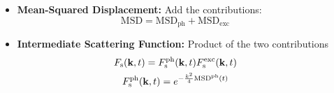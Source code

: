 \begin{frame}
\begin{columns}[T]
\begin{column}[T]{0.5\textwidth}
\end{column}


\begin{column}[t]{0.5\textwidth}
\vspace{-12pt}
\begin{itemize}
    \item<4-> \textbf{Mean-Squared Displacement:} Add the contributions:
    \begin{equation*}
    \mathrm{MSD}=\mathrm{MSD}_\mathrm{ph}+\mathrm{MSD}_\mathrm{exc}
    \end{equation*}
    \item<7-> \textbf{Intermediate Scattering Function:} Product of the two contributions
    \begin{gather*}
    F_\mathrm{s}(\mathbf{k},t) = F^\mathrm{ph}_\mathrm{s}(\mathbf{k},t) F^\mathrm{exc}_\mathrm{s}(\mathbf{k},t)
    \\
    F^\mathrm{ph}_\mathrm{s}(\mathbf{k},t) = e^{-\frac{k^2}{4}\mathrm{MSD}^\mathrm{ph}(t)}
    \end{gather*}
    
\end{itemize} 

\end{column}

\end{columns}

\end{frame}
